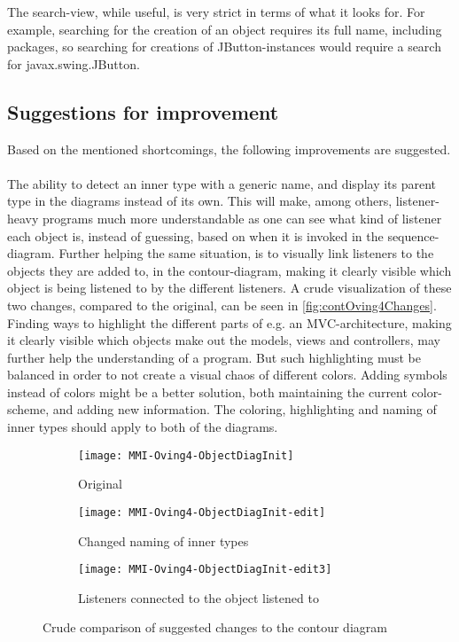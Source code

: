 The search-view, while useful, is very strict in terms of what it looks for.
For example, searching for the creation of an object requires its full name, including packages, so searching for creations of JButton-instances would require a search for javax.swing.JButton.
~\\

\subsection{Suggestions for improvement}\label{jiveSuggestions}

Based on the mentioned shortcomings, the following improvements are suggested.
~\\

The ability to detect an inner type with a generic name, and display its parent type in the diagrams instead of its own.
This will make, among others, listener-heavy programs much more understandable as one can see what kind of listener each object is, instead of guessing, based on when it is invoked in the sequence-diagram.
Further helping the same situation, is to visually link listeners to the objects they are added to, in the contour-diagram, making it clearly visible which object is being listened to by the different listeners.
A crude visualization of these two changes, compared to the original, can be seen in \autoref{fig:contOving4Changes}.
~\\

Finding ways to highlight the different parts of e.g. an MVC-architecture, making it clearly visible which objects make out the models, views and controllers, may further help the understanding of a program.
But such highlighting must be balanced in order to not create a visual chaos of different colors.
Adding symbols instead of colors might be a better solution, both maintaining the current color-scheme, and adding new information.
The coloring, highlighting and naming of inner types should apply to both of the diagrams.
~\\

\begin{figure}[H]
	\centering
	\begin{subfigure}{\textwidth}
		\centering
		\texttt{[image: MMI-Oving4-ObjectDiagInit]}
		\caption{Original}
		\label{fig:contOving4ChangesA}
	\end{subfigure}
	\begin{subfigure}{\textwidth}
		\centering
		\texttt{[image: MMI-Oving4-ObjectDiagInit-edit]}
		\caption{Changed naming of inner types}
		\label{fig:contOving4ChangesB}
	\end{subfigure}
	\begin{subfigure}{\textwidth}
		\centering
		\texttt{[image: MMI-Oving4-ObjectDiagInit-edit3]}
		\caption{Listeners connected to the object listened to}
		\label{fig:contOving4ChangesC}
	\end{subfigure}
	\caption{Crude comparison of suggested changes to the contour diagram}
	\label{fig:contOving4Changes} 
\end{figure}

